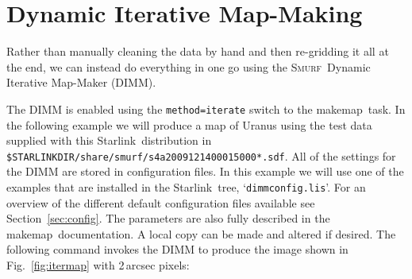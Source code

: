\documentclass[twoside,11pt]{article}
\newcommand{\htmladdnormallink}[2]{#1}
\newcommand{\xref}[3]{#1}
\newcommand{\xlabel}[1]{}
\renewcommand{\_}{\texttt{\symbol{95}}}
\newcommand{\starlink}{\htmladdnormallink{Starlink}{http://starlink.jach.hawaii.edu}}
\newcommand{\smurf}{\xref{\textsc{Smurf}}{sun258}{}}
\newcommand{\task}[1]{\textsf{#1}}
\newcommand{\makemap}{\xref{\task{makemap}}{sun258}{MAKEMAP}}
\begin{document}
\section{\xlabel{maps}Dynamic Iterative Map-Making}
\label{sec:maps}

Rather than manually cleaning the data by hand and then re-gridding it
all at the end, we can instead do everything in one go using the
\smurf\ Dynamic Iterative Map-Maker (DIMM).

The DIMM is enabled using the \texttt{method=iterate} switch to the
\makemap\ task. In the following example we will produce a map of
Uranus using the test data supplied with this \starlink\ distribution
in \texttt{\$STARLINK\_DIR/share/smurf/s4a20091214\_00015\_000*.sdf}. All of
the settings for the DIMM are stored in configuration files.  In this
example we will use one of the examples that are installed in the
\starlink\ tree, `\texttt{dimmconfig.lis}'. For an overview of the
different default configuration files available see
Section~\ref{sec:config}. The parameters are also fully described in
the \makemap\ documentation. A local copy can be made and altered if
desired. The following command invokes the DIMM to produce the image
shown in Fig.~\ref{fig:itermap} with 2\,arcsec pixels:
\end{document}
